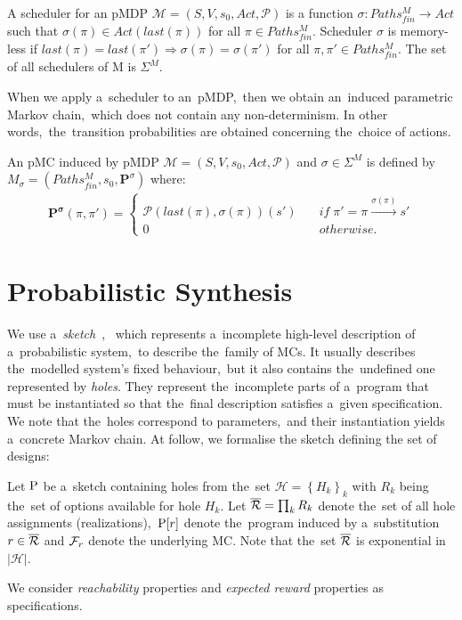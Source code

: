 \begin{definition}[Scheduler]
A scheduler for an pMDP $\mathcal{M} = (S, V, s_0, Act, \mathcal{P})$ is a function $\sigma: Paths_{fin}^{M} \rightarrow Act$ such that $\sigma(\pi) \in Act(last(\pi))$ for all $\pi \in Paths_{fin}^{M}$.
Scheduler $\sigma$ is memory-less if $last(\pi) = last(\pi') \Longrightarrow \sigma(\pi) = \sigma(\pi')$ for all $\pi, \pi' \in Paths_{fin}^{M}$.
The set of all schedulers of M is $\Sigma^M$.
\end{definition}
\noindent 
When we apply a~scheduler to an~pMDP,~then we obtain an~induced parametric Markov chain,~which does not contain any non-determinism.
In other words,~the~transition probabilities are obtained concerning the~choice of actions.

\begin{definition} \label{def:incuded_mc}
\cite{cegar}
An pMC induced by pMDP $\mathcal{M} = (S, V, s_0, Act, \mathcal{P})$ and $\sigma \in \Sigma^M$ is defined by $M_{\sigma} = ( Paths_{fin}^{M}, s_0, \mathbf{P}^{\sigma})$ where:
\begin{align*}
    \mathbf{P^{\sigma}}(\pi, \pi') = 
    \begin{cases}
        \mathcal{P}(last(\pi), \sigma(\pi))(s') \quad & if \; \pi' = \pi \overset{\sigma(\pi)}{\rightarrow} s' \\
         0 \quad & otherwise.
    \end{cases}
\end{align*}
\end{definition}


\section{Probabilistic Synthesis}
We use a~\textit{sketch}~\cite{sketching1,sygus}, ~which represents a~incomplete high-level description of a~probabilistic system,~to describe the~family of MCs.
It usually describes the~modelled system's fixed behaviour,~but it also contains the~undefined one represented by \textit{holes}.
They represent the~incomplete parts of a~program that must be instantiated so that the~final description satisfies a~given specification.
We note that the~holes correspond to parameters,~and their instantiation yields a~concrete Markov chain.
At follow, we formalise the sketch defining the set of designs:

\begin{definition}[Sketch]
Let $\mathrm{P}$ be a~sketch containing holes from the~set $\mathcal{H} = \left\{ H_k \right \}_k$ with $R_k$ being the~set of options available for hole $H_k$.
Let $\overline{\mathcal{R}} = \prod_k R_k$ denote the~set of all hole assignments (realizations),~$\mathrm{P}[r]$ denote the~program induced by a~substitution $r \in \overline{\mathcal{R}}$ and $\mathcal{F}_r$ denote the underlying MC.
Note that the~set $\overline{\mathcal{R}}$ is exponential in $\lvert \mathcal{H} \rvert$.
\end{definition}
\noindent
We consider \textit{reachability} properties and \textit{expected reward} properties as specifications.

